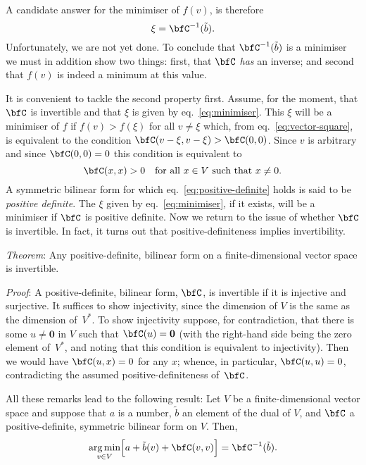 \documentclass[10pt, a4paper]{article}
\DeclareMathOperator*{\argmin}{arg\,min}
\begin{document}
A candidate answer for the minimiser of $f(v)$, is therefore
\begin{equation}
  \label{eq:minimiser}
  \xi = \bfC^{-1}(\tilde{b}).
\end{equation}
Unfortunately, we are not yet done. To conclude that
$\bfC^{-1}(\tilde{b})$ is a minimiser we must in addition show two
things: first, that $\bfC$ \emph{has} an inverse; and second that
$f(v)$ is indeed a minimum at this value.

It is convenient to tackle the second property first. Assume, for the
moment, that $\bfC$ is invertible and that $\xi$ is given by
eq.~\eqref{eq:minimiser}. This $\xi$ will be a minimiser of $f$ if
$f(v)>f(\xi)$ for all $v \neq \xi$ which, from eq.~\eqref{eq:vector-square},
is equivalent to the condition $\bfC(v-\xi,v-\xi)>\bfC(0,0)$. Since
$v$ is arbitrary and since $\bfC(0,0)=0$ this condition is equivalent
to
\begin{equation}
  \label{eq:positive-definite}
  \bfC(x,x) > 0 \quad\text{for all $x\in V$ such that $x\neq0$}.
\end{equation}
A symmetric bilinear form for which eq.~\eqref{eq:positive-definite}
holds is said to be \emph{positive definite}. The $\xi$ given by
eq.~\eqref{eq:minimiser}, if it exists, will be a minimiser if $\bfC$
is positive definite. Now we return to the issue of whether $\bfC$ is
invertible. In fact, it turns out that positive-definiteness implies
invertibility.

\emph{Theorem}: Any positive-definite, bilinear form on a
finite-dimensional vector space is invertible.

\emph{Proof}: A positive-definite, bilinear form, $\bfC$, is
invertible if it is injective and surjective. It suffices to show
injectivity, since the dimension of $V$ is the same as the dimension
of~$V^*$. To show injectivity suppose, for contradiction, that there
is some $u\neq\bm{0}$ in $V$ such that $\bfC(u)=\bm{0}$ (with the
right-hand side being the zero element of~$V^*$, and noting that this
condition is equivalent to injectivity). Then we would have
$\bfC(u, x) =0$ for any $x$; whence, in particular, $\bfC(u,u)=0$,
contradicting the assumed positive-definiteness of~$\bfC$.

All these remarks lead to the following result: Let $V$ be a
finite-dimensional vector space and suppose that $a$ is a number,
$\tilde{b}$ an element of the dual of $V$, and $\bfC$ a
positive-definite, symmetric bilinear form on $V$. Then,
\[
  \argmin_{v\in V} \Bigl[a +\tilde{b}(v) + \bfC(v,v) \Bigr] = \bfC^{-1}(\tilde{b}). 
\]
\end{document}
